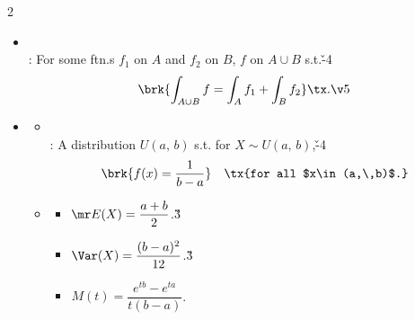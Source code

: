 \documentclass[dvipdfmx,a4paper,titlepage,9pt]{jsarticle}
\begin{document}
\begin{multicols*}{2}
\begin{itemize}[label={-}]
\item{}\\
: For some ftn.s $f_1$ on $A$ and $f_2$ on $B$, $f$ on $A\cup B$ s.t.\v{-4}
$$\brk{\int_{A\cup B}f=\int_A f_1+\int_B f_2}\tx.\v5$$

\item{}
\begin{itemize}[label=\Cdot]
\setlength{\leftskip}{-10pt}
\item{}\\
: A distribution $U(a,\,b)$ s.t. for $X\sim U(a,\,b)$,\v{-4}
$$\brk{f(x)=\frac1{b-a}}\quad\tx{for all $x\in(a,\,b)$.}$$

\item{}
\begin{itemize}[label=-]
\setlength{\leftskip}{-5pt}
\item $\mr E(X)=\dfrac{a+b}2$.\v3
\item $\Var(X)=\dfrac{(b-a)^2}{12}$.\v3
\item $M(t)=\dfrac{e^{tb}-e^{ta}}{t(b-a)}$.
\end{itemize}
\end{itemize}
\end{itemize}
\end{multicols*}
\end{document}
